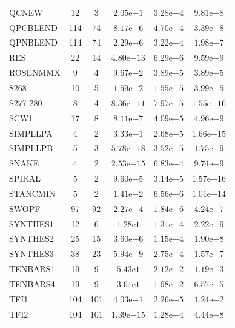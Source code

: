 \documentclass[11pt]{article}
\begin{document}
\begin{center}
\begin{longtable}{lccccc}
QCNEW & 12 & 3 & $2.05\mathrm{e}{-1}$ & $3.28\mathrm{e}{-4}$ & $9.81\mathrm{e}{-8}$ \\
QPCBLEND & 114 & 74 & $8.17\mathrm{e}{-6}$ & $4.70\mathrm{e}{-4}$ & $3.39\mathrm{e}{-8}$ \\
QPNBLEND & 114 & 74 & $2.29\mathrm{e}{-6}$ & $3.22\mathrm{e}{-4}$ & $1.98\mathrm{e}{-7}$ \\
RES & 22 & 14 & $4.80\mathrm{e}{-13}$ & $6.29\mathrm{e}{-6}$ & $9.59\mathrm{e}{-9}$ \\
ROSENMMX & 9 & 4 & $9.67\mathrm{e}{-2}$ & $3.89\mathrm{e}{-5}$ & $3.89\mathrm{e}{-5}$ \\
S268 & 10 & 5 & $1.59\mathrm{e}{-2}$ & $1.55\mathrm{e}{-5}$ & $3.99\mathrm{e}{-5}$ \\
S277-280 & 8 & 4 & $8.36\mathrm{e}{-11}$ & $7.97\mathrm{e}{-5}$ & $1.55\mathrm{e}{-16}$ \\
SCW1 & 17 & 8 & $8.11\mathrm{e}{-7}$ & $4.09\mathrm{e}{-5}$ & $4.96\mathrm{e}{-9}$ \\
SIMPLLPA & 4 & 2 & $3.33\mathrm{e}{-1}$ & $2.68\mathrm{e}{-5}$ & $1.66\mathrm{e}{-15}$ \\
SIMPLLPB & 5 & 3 & $5.78\mathrm{e}{-18}$ & $3.52\mathrm{e}{-5}$ & $1.75\mathrm{e}{-9}$ \\
SNAKE & 4 & 2 & $2.53\mathrm{e}{-15}$ & $6.83\mathrm{e}{-4}$ & $9.74\mathrm{e}{-9}$ \\
SPIRAL & 5 & 2 & $9.60\mathrm{e}{-5}$ & $3.14\mathrm{e}{-5}$ & $1.57\mathrm{e}{-16}$ \\
STANCMIN & 5 & 2 & $1.41\mathrm{e}{-2}$ & $6.56\mathrm{e}{-6}$ & $1.01\mathrm{e}{-14}$ \\
SWOPF & 97 & 92 & $2.27\mathrm{e}{-4}$ & $1.84\mathrm{e}{-6}$ & $4.24\mathrm{e}{-7}$ \\
SYNTHES1 & 12 & 6 & $1.28\mathrm{e}{1}$ & $1.31\mathrm{e}{-4}$ & $2.22\mathrm{e}{-9}$ \\
SYNTHES2 & 25 & 15 & $3.60\mathrm{e}{-6}$ & $1.15\mathrm{e}{-4}$ & $1.90\mathrm{e}{-8}$ \\
SYNTHES3 & 38 & 23 & $5.94\mathrm{e}{-9}$ & $2.75\mathrm{e}{-4}$ & $1.57\mathrm{e}{-7}$ \\
TENBARS1 & 19 & 9 & $5.43\mathrm{e}{1}$ & $2.12\mathrm{e}{-2}$ & $1.19\mathrm{e}{-3}$ \\
TENBARS4 & 19 & 9 & $3.61\mathrm{e}{1}$ & $1.98\mathrm{e}{-2}$ & $6.57\mathrm{e}{-5}$ \\
TFI1 & 104 & 101 & $4.03\mathrm{e}{-1}$ & $2.26\mathrm{e}{-5}$ & $1.24\mathrm{e}{-2}$ \\
TFI2 & 104 & 101 & $1.39\mathrm{e}{-15}$ & $1.28\mathrm{e}{-4}$ & $4.44\mathrm{e}{-8}$ \\

\end{longtable}
\end{center}
\end{document}
